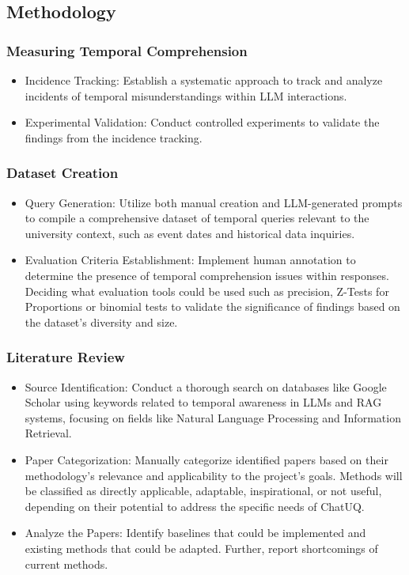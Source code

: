 \subsection{Methodology}

\subsubsection{Measuring Temporal Comprehension}

\begin{itemize}
    \item Incidence Tracking: Establish a systematic approach to track and analyze incidents of temporal misunderstandings within LLM interactions.
    \item Experimental Validation: Conduct controlled experiments to validate the findings from the incidence tracking.
\end{itemize}

\subsubsection{Dataset Creation}

\begin{itemize}
    \item Query Generation: Utilize both manual creation and LLM-generated prompts to compile a comprehensive dataset of temporal queries relevant to the university context, such as event dates and historical data inquiries.
    \item Evaluation Criteria Establishment: Implement human annotation to determine the presence of temporal comprehension issues within responses. Deciding what evaluation tools could be used such as precision, Z-Tests for Proportions or binomial tests to validate the significance of findings based on the dataset's diversity and size.
\end{itemize}



\subsubsection{Literature Review}

\begin{itemize}
    \item Source Identification: Conduct a thorough search on databases like Google Scholar using keywords related to temporal awareness in LLMs and RAG systems, focusing on fields like Natural Language Processing and Information Retrieval.
    \item Paper Categorization: Manually categorize identified papers based on their methodology's relevance and applicability to the project's goals. Methods will be classified as directly applicable, adaptable, inspirational, or not useful, depending on their potential to address the specific needs of ChatUQ.
    \item Analyze the Papers: Identify baselines that could be implemented and existing methods that could be adapted. Further, report shortcomings of current methods.
\end{itemize}

